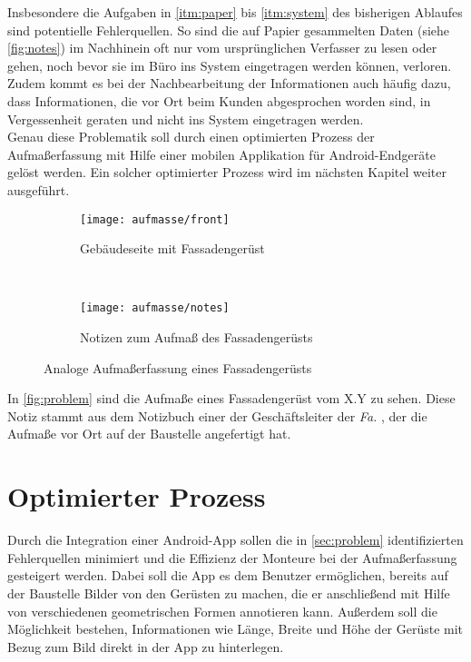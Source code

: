 Insbesondere die Aufgaben in \autoref{itm:paper} bis \autoref{itm:system} des bisherigen Ablaufes sind potentielle Fehlerquellen.
So sind die auf Papier gesammelten Daten (siehe \autoref{fig:notes}) im Nachhinein oft nur vom ursprünglichen Verfasser zu lesen oder gehen, noch bevor sie im Büro ins System eingetragen werden können, verloren.
Zudem kommt es bei der Nachbearbeitung der Informationen auch häufig dazu, dass Informationen, die vor Ort beim Kunden abgesprochen worden sind, in Vergessenheit geraten und nicht ins System eingetragen werden. \\

Genau diese Problematik soll durch einen optimierten Prozess der Aufmaßerfassung mit Hilfe einer mobilen Applikation für Android-Endgeräte gelöst werden.
Ein solcher optimierter Prozess wird im nächsten Kapitel weiter ausgeführt.

\begin{figure}[h]
  \begin{subfigure}[t]{0.4\textwidth}
    \centering
    \texttt{[image: aufmasse/front]}
    \caption{Gebäudeseite mit Fassadengerüst}
  \end{subfigure}
  ~
  \begin{subfigure}[t]{0.4\textwidth}
    \centering
    \texttt{[image: aufmasse/notes]}
    \caption{Notizen zum Aufmaß des Fassadengerüsts}
    \label{fig:notes}
  \end{subfigure}
  \centering
  \caption{Analoge Aufmaßerfassung eines Fassadengerüsts}
  \label{fig:problem}
\end{figure}

In \autoref{fig:problem} sind die Aufmaße eines Fassadengerüst vom X.Y zu sehen.
Diese Notiz stammt aus dem Notizbuch einer der Geschäftsleiter der \emph{Fa.} \vr{}, der die Aufmaße vor Ort auf der Baustelle angefertigt hat.

\section{Optimierter Prozess}
Durch die Integration einer Android-App sollen die in \autoref{sec:problem} identifizierten Fehlerquellen minimiert und die Effizienz der Monteure bei der Aufmaßerfassung gesteigert werden.
Dabei soll die App es dem Benutzer ermöglichen, bereits auf der Baustelle Bilder von den Gerüsten zu machen, die er anschließend mit Hilfe von verschiedenen geometrischen Formen annotieren kann.
Außerdem soll die Möglichkeit bestehen, Informationen wie Länge, Breite und Höhe der Gerüste mit Bezug zum Bild direkt in der App zu hinterlegen. \\

